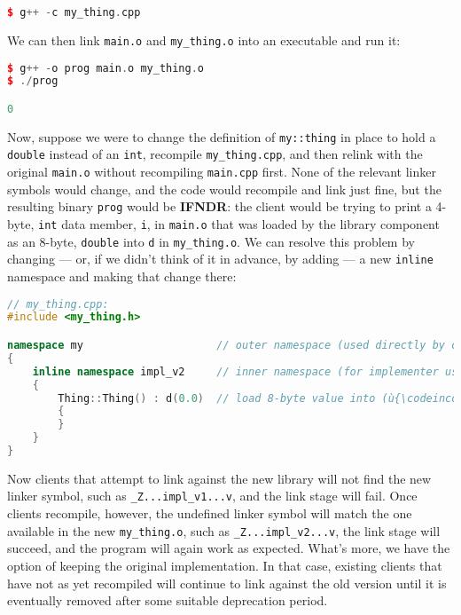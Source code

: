 \begin{lstlisting}[language=C++]
$ g++ -c my_thing.cpp
\end{lstlisting}

\noindent We can then link \texttt{main.o} and \texttt{my\_thing.o} into an
executable and run it:

\begin{lstlisting}[language=C++]
$ g++ -o prog main.o my_thing.o
$ ./prog

0
\end{lstlisting}

\noindent Now, suppose we were to change the definition of \texttt{my::thing} in
place to hold a \texttt{double} instead of an \texttt{int}, recompile
\texttt{my\_thing.cpp}, and then relink with the original
\texttt{main.o} without recompiling \texttt{main.cpp} first. None of the
relevant linker symbols would change, and the code would recompile and link
just fine, but the resulting binary \texttt{prog} would be
\textbf{IFNDR}: the client would be trying to print a 4-byte,
\texttt{int} data member, \texttt{i}, in \texttt{main.o} that was loaded
by the library component as an 8-byte, \texttt{double} into \texttt{d}
in \texttt{my\_thing.o}. We can resolve this problem by changing --- or,
if we didn't think of it in advance, by adding --- a new \texttt{inline}
namespace and making that change there:

\begin{lstlisting}[language=C++]
// my_thing.cpp:
#include <my_thing.h>

namespace my                     // outer namespace (used directly by clients)
{
    inline namespace impl_v2     // inner namespace (for implementer use only)
    {
        Thing::Thing() : d(0.0)  // load 8-byte value into (ù{\codeincomments{Thing}}ù)'s data member
        {
        }
    }
}
\end{lstlisting}

\noindent Now clients that attempt to link against the new library will not find
the new linker symbol, such as \texttt{\_Z...impl\_v1...v}, and the link
stage will fail. Once clients recompile, however, the undefined linker
symbol will match the one available in the new \texttt{my\_thing.o},
such as \texttt{\_Z...impl\_v2...v}, the link stage will succeed, and
the program will again work as expected. What's more, we have the option
of keeping the original implementation. In that case, existing clients
that have not as yet recompiled will continue to link against the old
version until it is eventually removed after some suitable deprecation
period.

